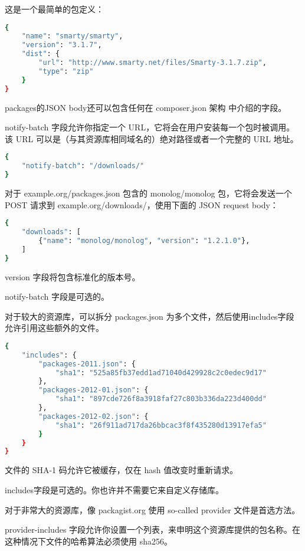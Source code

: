 这是一个最简单的包定义：

\begin{lstlisting}[language=bash]
{
    "name": "smarty/smarty",
    "version": "3.1.7",
    "dist": {
        "url": "http://www.smarty.net/files/Smarty-3.1.7.zip",
        "type": "zip"
    }
}
\end{lstlisting}

packages的JSON body还可以包含任何在 composer.json 架构 中介绍的字段。

notify-batch 字段允许你指定一个 URL，它将会在用户安装每一个包时被调用。该 URL 可以是（与其资源库相同域名的）绝对路径或者一个完整的 URL 地址。

\begin{lstlisting}[language=bash]
{
    "notify-batch": "/downloads/"
}
\end{lstlisting}

对于 example.org/packages.json 包含的 monolog/monolog 包，它将会发送一个 POST 请求到 example.org/downloads/，使用下面的 JSON request body：



\begin{lstlisting}[language=bash]
{
    "downloads": [
        {"name": "monolog/monolog", "version": "1.2.1.0"},
    ]
}
\end{lstlisting}

version 字段将包含标准化的版本号。

notify-batch 字段是可选的。


对于较大的资源库，可以拆分 packages.json 为多个文件，然后使用includes字段允许引用这些额外的文件。


\begin{lstlisting}[language=bash]
{
    "includes": {
        "packages-2011.json": {
            "sha1": "525a85fb37edd1ad71040d429928c2c0edec9d17"
        },
        "packages-2012-01.json": {
            "sha1": "897cde726f8a3918faf27c803b336da223d400dd"
        },
        "packages-2012-02.json": {
            "sha1": "26f911ad717da26bbcac3f8f435280d13917efa5"
        }
    }
}
\end{lstlisting}

文件的 SHA-1 码允许它被缓存，仅在 hash 值改变时重新请求。

includes字段是可选的。你也许并不需要它来自定义存储库。



对于非常大的资源库，像 packagist.org 使用 so-called provider 文件是首选方法。

provider-includes 字段允许你设置一个列表，来申明这个资源库提供的包名称。在这种情况下文件的哈希算法必须使用 sha256。

